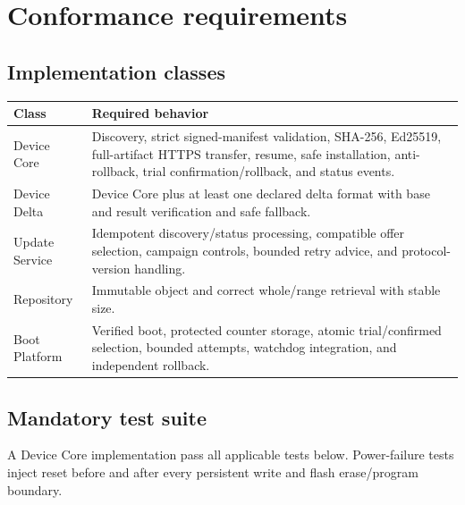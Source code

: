 \section{Conformance requirements}

\subsection{Implementation classes}

\begin{tabularx}{\textwidth}{@{}L{33mm}Y@{}}
  \toprule
  \textbf{Class} & \textbf{Required behavior} \\
  \midrule
  Device Core & Discovery, strict signed-manifest validation, SHA-256, Ed25519,
    full-artifact HTTPS transfer, resume, safe installation, anti-rollback,
    trial confirmation/rollback, and status events. \\
  Device Delta & Device Core plus at least one declared delta format with base and
    result verification and safe fallback. \\
  Update Service & Idempotent discovery/status processing, compatible offer
    selection, campaign controls, bounded retry advice, and protocol-version handling. \\
  Repository & Immutable object and correct whole/range retrieval with stable size. \\
  Boot Platform & Verified boot, protected counter storage, atomic trial/confirmed
    selection, bounded attempts, watchdog integration, and independent rollback. \\
  \bottomrule
\end{tabularx}

\subsection{Mandatory test suite}

A Device Core implementation \must pass all applicable tests below. Power-failure
tests inject reset before and after every persistent write and flash erase/program
boundary.

